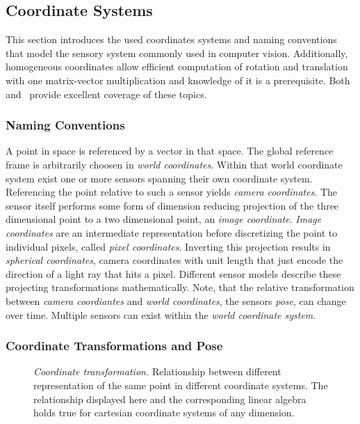 \subsection{Coordinate Systems}

This section introduces the used coordinates systems and naming conventions that model the sensory system commonly used in computer vision.
Additionally, homogeneous coordinates allow efficient computation of rotation and translation with one matrix-vector multiplication and knowledge of it is a prerequisite.
Both~\cite{hartley_2004} and~\cite{corke_2011} provide excellent coverage of these topics.

\subsubsection*{Naming Conventions}

A point in space is referenced by a vector in that space.
The global reference frame is arbitrarily choosen in \emph{world coordinates}.
Within that world coordinate system exist one or more sensors spanning their own coordinate system.
Referencing the point relative to such a sensor yields \emph{camera coordinates}.
The sensor itself performs some form of dimension reducing projection of the three dimensional point to a two dimensional point, an \emph{image coordinate}.
\emph{Image coordinates} are an intermediate representation before discretizing the point to individual pixels, called \emph{pixel coordinates}.
Inverting this projection results in \emph{spherical coordinates}, camera coordinates with unit length that just encode the direction of a light ray that hits a pixel.
Different sensor models describe these projecting transformations mathematically.
Note, that the relative transformation between \emph{camera coordiantes} and \emph{world coordinates}, the sensors \emph{pose}, can change over time.
Multiple sensors can exist within the \emph{world coordinate system}.

\subsubsection*{Coordinate Transformations and Pose}

\begin{figure}[H]
    \scalebox{0.7}{%
    
    }
    \caption[Coordinate transformation]{\emph{Coordinate transformation.} Relationship between different representation of the same point in different coordinate systems. The relationship displayed here and the corresponding linear algebra holds true for cartesian coordinate systems of any dimension.}
\end{figure}

